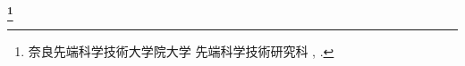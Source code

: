 \begin{center}
 \renewcommand{\thefootnote}{\fnsymbol{footnote}}
 \Large\bfseries \jtitle \footnote[1]{奈良先端科学技術大学院大学 先端科学技術研究科 \jdoctitle, 
 \jdate.}
 \renewcommand{\thefootnote}{\arabic{footnote}}
\end{center}

\vspace*{1truemm}

\begin{center}
 \large\jauthor
\end{center}

\vspace*{1truemm}

\begin{center}
\end{center}

\vspace*{2truemm}
\par
\jabstract
\vspace*{5truemm}

\begin{flushleft}
\end{flushleft}
\vspace{-2mm}\keywords
